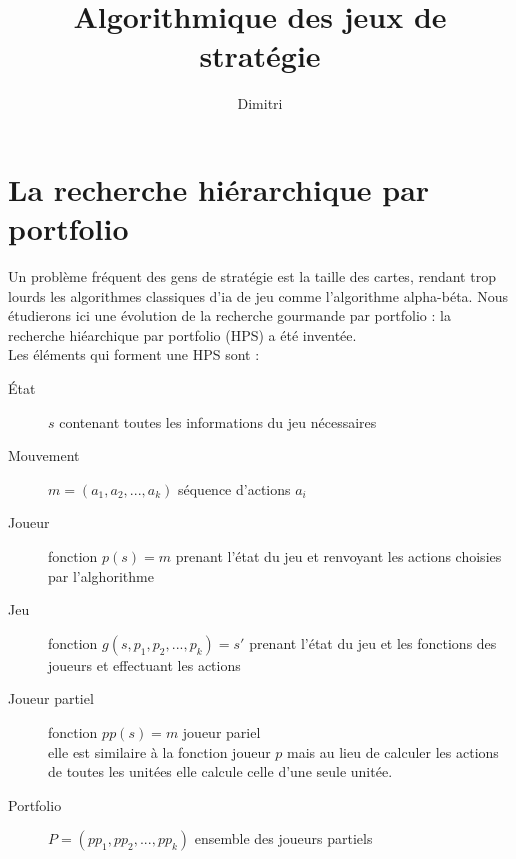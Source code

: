 \documentclass[a4paper, 11pt]{article}
\theoremstyle{definition}
\begin{document}
\title{Algorithmique des jeux de stratégie}
\author{Dimitri }


\section{La recherche hiérarchique par portfolio}
Un problème fréquent des gens de stratégie est la taille des cartes, rendant trop
lourds les algorithmes classiques d'ia de jeu comme l'algorithme alpha-béta. 
Nous étudierons ici une évolution de la recherche gourmande par portfolio : la
recherche hiéarchique par portfolio (HPS) a été inventée.\\
Les éléments qui forment une HPS sont :
\begin{description}
    \item[État] $s$ contenant toutes les informations du jeu nécessaires
    \item[Mouvement] $m= ( a_1, a_2, ..., a_k )$ séquence d'actions $a_i$
    \item[Joueur] fonction $p(s) = m$ prenant l'état du jeu et renvoyant les 
    actions choisies par l'alghorithme
    \item[Jeu] fonction $g(s, p_1, p_2, ..., p_k) = s'$ prenant l'état du jeu et
    les fonctions des joueurs et effectuant les actions
    \item[Joueur partiel] fonction $pp(s) = m$ joueur pariel \\
    elle est similaire à la fonction joueur $p$ mais au lieu de calculer les actions
    de toutes les unitées elle calcule celle d'une seule unitée.
    \item[Portfolio] $P = (pp_1, pp_2, ..., pp_k)$ ensemble des joueurs partiels
\end{description}
\end{document}

